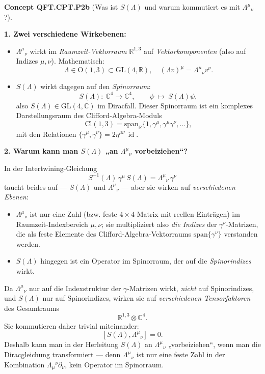 \documentclass[10pt, letterpaper]{article}
\newcommand{\id}{\operatorname{id}}
\newcommand{\R}{\mathbb{R}}
\newcommand{\C}{\mathbb{C}}
\newcommand{\Cl}{\mathrm{Cl}}
\newcommand{\GL}{\mathrm{GL}}
\newcommand{\Ogroup}{\mathrm{O}}
\newcommand{\CustomHeading}[3]{%
  \par\medskip\noindent%
  \textbf{#1 #2} \textnormal{(#3)}.\enskip%
}
\newenvironment{CONC}[2]{\begin{unitbox}\CustomHeading{Concept}{#1}{#2}}{\end{unitbox}}
\begin{document}
\begin{CONC}{QFT.CPT.P2b}{Was ist $S(\Lambda)$ und warum kommutiert es mit $\Lambda^\mu{}_\nu$?}
\textbf{1. Zwei verschiedene Wirkebenen:}
\begin{itemize}
  \item $\Lambda^\mu{}_\nu$ wirkt im \emph{Raumzeit-Vektorraum} $\R^{1,3}$ auf \emph{Vektorkomponenten} (also auf Indizes $\mu,\nu$).  
  Mathematisch:
  \[
    \Lambda \in \Ogroup(1,3)\subset\GL(4,\R),
    \quad (\Lambda v)^\mu = \Lambda^\mu{}_\nu v^\nu.
  \]
  \item $S(\Lambda)$ wirkt dagegen auf den \emph{Spinorraum}:
  \[
    S(\Lambda): \ \C^4 \longrightarrow \C^4, \qquad
    \psi \ \mapsto\ S(\Lambda)\psi,
  \]
  also $S(\Lambda)\in\GL(4,\C)$ im Diracfall.  
  Dieser Spinorraum ist ein komplexes Darstellungsraum des Clifford-Algebra-Moduls
  \[
    \Cl(1,3) = \mathrm{span}_{\R}\{1,\gamma^\mu, \gamma^\mu\gamma^\nu, \dots\},
  \]
  mit den Relationen $\{\gamma^\mu,\gamma^\nu\}=2\eta^{\mu\nu}\,\id$.
\end{itemize}

\textbf{2. Warum kann man $S(\Lambda)$ „an $\Lambda^\mu{}_\nu$ vorbeiziehen“?}

In der Intertwining-Gleichung
\[
S^{-1}(\Lambda)\,\gamma^\mu\,S(\Lambda)=\Lambda^\mu{}_\nu\,\gamma^\nu
\tag{$\star$}
\]
taucht beides auf — $S(\Lambda)$ und $\Lambda^\mu{}_\nu$ — aber sie wirken auf \emph{verschiedenen Ebenen}:

\begin{itemize}
  \item $\Lambda^\mu{}_\nu$ ist nur eine Zahl (bzw. feste $4\times4$-Matrix mit reellen Einträgen) im Raumzeit-Indexbereich $\mu,\nu$;  
    sie multipliziert also \emph{die Indizes} der $\gamma^\nu$-Matrizen, die als feste Elemente des Clifford-Algebra-Vektorraums $\mathrm{span}\{\gamma^\nu\}$ verstanden werden.
  \item $S(\Lambda)$ hingegen ist ein Operator im Spinorraum, der auf die \emph{Spinorindizes} wirkt.
\end{itemize}

Da $\Lambda^\mu{}_\nu$ nur auf die Indexstruktur der $\gamma$-Matrizen wirkt, \emph{nicht} auf Spinorindizes, und $S(\Lambda)$ nur auf Spinorindizes, wirken sie auf \emph{verschiedenen Tensorfaktoren} des Gesamtraums
\[
\R^{1,3} \otimes \C^4.
\]
Sie kommutieren daher trivial miteinander:
\[
[S(\Lambda),\Lambda^\mu{}_\nu]=0.
\]
Deshalb kann man in der Herleitung $S(\Lambda)$ an $\Lambda^\mu{}_\nu$ „vorbeiziehen“, wenn man die Diracgleichung transformiert — denn $\Lambda^\mu{}_\nu$ ist nur eine feste Zahl in der Kombination $\Lambda_\mu{}^\nu \partial_\nu$, kein Operator im Spinorraum.


\end{CONC}
\end{document}
